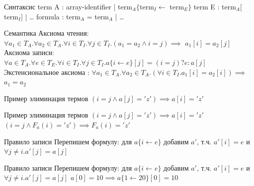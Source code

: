 \documentclass{beamer}
\begin{document}
\begin{frame}{Синтаксис}
term A : array-identifier | term$_A\{$term$_I \leftarrow$ term$_E\}$\newline
term E : term$_A[$term$_I]$ | \dots\newline
formula : term$_A$ = term$_A$ | \dots\newline
\end{frame}

\begin{frame}{Семантика}
Аксиома чтения:
$\forall a_1 \in T_A. \forall a_2 \in T_A. \forall i \in T_I. \forall j \in T_I. (a_1 = a_2 \wedge i = j) \implies$\newline
$a_1[i] = a_2[j]$\newline
Аксиома записи:
$\forall a \in T_A. \forall e \in T_E. \forall i \in T_I. \forall j \in T_I. a\{i\leftarrow e\}[j] = (i = j)? e : a[j]$\newline
Экстенсиональное аксиома :\newline
$\forall a_1 \in T_A. \forall a_2 \in T_A. (\forall i \in T_I. a_1[i] = a_2 [i]) \implies$\newline
$a_1 = a_2$
\end{frame}

\begin{frame}{Пример элиминация термов}
$(i = j \wedge a[j] = 'z') \implies a[i] = 'z'$\newline
\end{frame}

\begin{frame}{Пример элиминация термов}
$(i = j \wedge a[j] = 'z') \implies a[i] = 'z'$\newline
$(i = j \wedge F_a(i) = 'z') \implies F_a(i) = 'z'$\newline
\end{frame}

\begin{frame}{Правило записи}
Перепишем формулу:\newline
для $a\{i\leftarrow e\}$ добавим $a'$, т.ч. $a'[i] = e$ и $\forall j\ne i. a'[j] = a[j]$\newline
\end{frame}

\begin{frame}{Правило записи}
Перепишем формулу:\newline
для $a\{i\leftarrow e\}$ добавим $a'$, т.ч. $a'[i] = e$ и $\forall j\ne i. a'[j] = a[j]$\newline
$a[0] = 10 \implies a\{1 \leftarrow 20\}[0] = 10$\newline
\end{frame}
\end{document}
